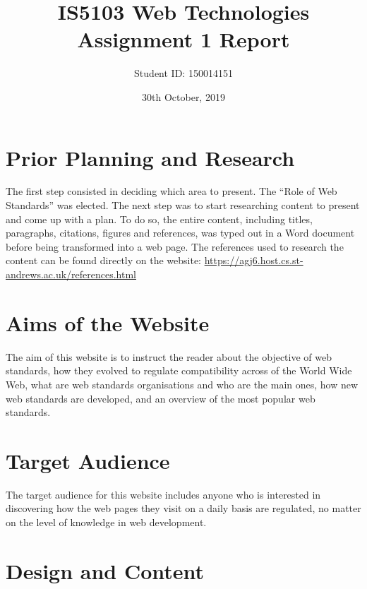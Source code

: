\documentclass[letterpaper,12pt]{article}
\begin{document}
\title{IS5103 Web Technologies\\Assignment 1 Report}
\author{Student ID: 150014151}
\date{30th October, 2019}
\maketitle
\newpage

\tableofcontents
\newpage

\section{Prior Planning and Research}
\label{sec:prior-planning-research}

The first step consisted in deciding which area to present. The ``Role of Web Standards'' was elected. The next step was to start researching content to present and come up with a plan. To do so, the entire content, including titles, paragraphs, citations, figures and references, was typed out in a Word document before being transformed into a web page. The references used to research the content can be found directly on the website: \url{https://agj6.host.cs.st-andrews.ac.uk/references.html}

\section{Aims of the Website}
\label{sec:aims}

The aim of this website is to instruct the reader about the objective of web standards, how they evolved to regulate compatibility across of the World Wide Web, what are web standards organisations and who are the main ones, how new web standards are developed, and an overview of the most popular web standards.

\section{Target Audience}
\label{sec:target-audience}

The target audience for this website includes anyone who is interested in discovering how the web pages they visit on a daily basis are regulated, no matter on the level of knowledge in web development.

\section{Design and Content}
\label{sec:design-content}
\end{document}
